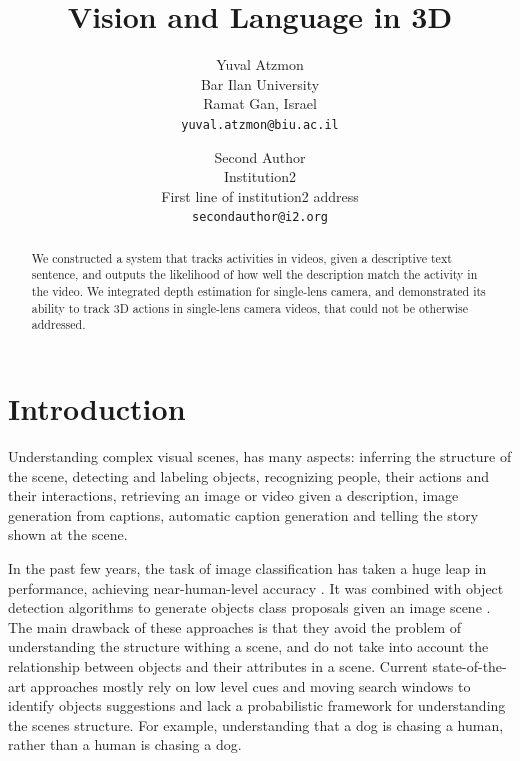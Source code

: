 \documentclass[10pt,twocolumn,letterpaper]{article}
\begin{document}
\title{Vision and Language in 3D}

\author{Yuval Atzmon\\
Bar Ilan University\\
Ramat Gan, Israel\\
{\tt\small yuval.atzmon@biu.ac.il}
\and
Second Author\\
Institution2\\
First line of institution2 address\\
{\tt\small secondauthor@i2.org}
}

\maketitle

\begin{abstract}
 We constructed a system that tracks activities in videos, given a descriptive text sentence, and outputs the likelihood of how well the description match the activity in the video. We integrated depth estimation for single-lens camera, and demonstrated its ability to track 3D actions in single-lens camera videos, that could not be otherwise addressed. 
 

\end{abstract}

\section{Introduction}

Understanding complex visual scenes, has many aspects: inferring the structure of the scene, detecting and labeling objects, recognizing people, their actions and their interactions, retrieving an image or video given a description, image generation from captions, automatic caption generation and telling the story shown at the scene.

In the past few years, the task of image classification has taken a huge leap in performance, achieving near-human-level accuracy \cite{imagenetHistory, krizhevsky2012imagenet, googlenet}. It was combined with object detection algorithms to generate objects class proposals given an image scene \cite{googlenet, girshick2014rcnn}. The main drawback of these approaches is that they avoid the problem of understanding the structure withing a scene, and do not take into account the relationship between objects and their attributes in a scene. Current state-of-the-art approaches mostly rely on low level cues and moving search windows to identify objects suggestions and lack a probabilistic framework for understanding the scenes structure. For example, understanding that a dog is chasing a human, rather than a human is chasing a dog.
\end{document}
